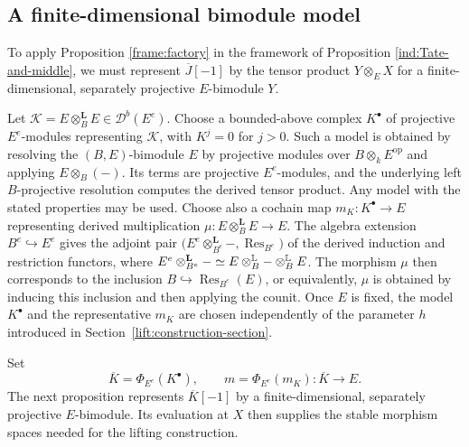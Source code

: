\documentclass[11pt]{article}
\begin{document}
\subsection{A finite-dimensional bimodule model}
\label{ind:finite-Y}

To apply Proposition \ref{frame:factory} in the framework of Proposition \ref{ind:Tate-and-middle}, we must represent $\overline J[-1]$ by the tensor product $Y\otimes_EX$  for a finite-dimensional, separately projective $E$-bimodule $Y$.

Let $\mathcal K=E\otimes_B^{\mathbf L}E\in\mathscr D^b(E^e)$.
Choose a bounded-above complex $K^\bullet$ of projective $E^e$-modules
representing $\mathcal K$, with $K^j=0$ for $j>0$.
Such a model is obtained by resolving the $(B,E)$-bimodule $E$ by
projective modules over $B\otimes_kE^{\mathrm{op}}$ and applying
$E\otimes_B(-)$. Its terms are projective $E^e$-modules, and the
underlying left $B$-projective resolution computes the derived
tensor product. Any model with the stated properties may be used.
Choose also a cochain map $m_K:K^\bullet\to E$ representing
derived multiplication $\mu:E\otimes_B^{\mathbf L}E\to E$.
The algebra extension $B^e\hookrightarrow E^e$ gives the adjoint pair $\big(E^e\otimes_{B^e}^{\mathbf L}-, \operatorname{Res}_{B^e}\big)$ of the derived induction and restriction functors, where $E^e\otimes_{B^e}^{\mathbf L}-\simeq E\otimes^{\rm\mathbb L}_B-\otimes^{\rm\mathbb L}_BE$. The morphism $\mu$ then corresponds to the inclusion $B\hookrightarrow\operatorname{Res}_{B^e}(E)$, or equivalently, $\mu$ is obtained by inducing this inclusion and then applying the counit. Once $E$ is fixed, the model $K^\bullet$ and the representative $m_K$ are chosen independently of the parameter $h$ introduced in Section~\ref{lift:construction-section}.

Set
\[
 \overline K=\Phi_{E^e}(K^\bullet),\qquad
 m=\Phi_{E^e}(m_K):\overline K\longrightarrow E.
\]
The next proposition represents $\overline K[-1]$ by a finite-dimensional, separately projective $E$-bimodule. Its evaluation at $X$ then supplies the stable morphism spaces needed for the lifting construction.
\end{document}
